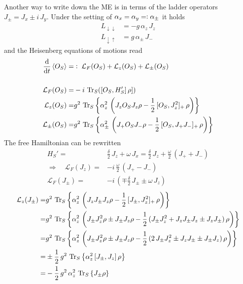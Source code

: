 \documentclass{article}
\begin{document}
Another way to write down the ME is in terms of the ladder operators $J_\pm=J_x\pm i\,J_y$. Under the setting of $\alpha_x=\alpha_y=\vcentcolon\alpha_\pm$ it holds
\begin{align*}
    L_{\downarrow\downarrow}&=-g\,\alpha_z\,J_z\\
    L_{\downarrow\uparrow}&={g}\,\alpha_\pm\,J_-
\end{align*}
and the Heisenberg equations of motions read
\begin{align*}
    \frac{\text{d}}{\text{d}t} \braket{O_S}=&\vcentcolon\;\mathcal{L}_F(O_S)+\mathcal{L}_z(O_S)+\mathcal{L}_{\pm}(O_S)\\\\
    \mathcal{L}_F(O_S)=&-i\,\operatorname{Tr}_S([O_S,H_S']\,\rho])\\
    \mathcal{L}_z(O_S)=&g^2\,\operatorname{Tr}_S\left\{\alpha_z^2\,\left(J_z O_S J_z \rho-\frac{1}{2}\,[O_S,J_z^2]_+\,\rho\right)\right\}\\
    \mathcal{L}_{\pm}(O_S)=&g^2\,\operatorname{Tr}_S\left\{\alpha_\pm^2\,\left(J_+ O_S J_- \rho-\frac{1}{2}\,[O_S,J_+ J_-]_+\,\rho\right)\right\}
\end{align*}
The free Hamiltonian can be rewritten
\begin{align*}
    H_S'=&\frac{\delta}{2}\,J_z+\omega\,J_x = \frac{\delta}{2}\,J_z+\frac{\omega}{2}\,(J_+ + J_-)\\
    \Rightarrow\quad \mathcal{L}_F(J_z)=&-i\,\frac{\omega}{2}\,(J_+ - J_-)\\
    \mathcal{L}_F(J_\pm)=&-i\,\left(\mp\frac{\delta}{2}\, J_\pm \pm \omega\, J_z\right)
\end{align*}
\begin{align*}
    \mathcal{L}_z(J_\pm)=&g^2\,\operatorname{Tr}_S\left\{\alpha_z^2\,\left(J_z J_\pm J_z \rho-\frac{1}{2}\,[J_\pm,J_z^2]_+\,\rho\right)\right\}\\
    =&g^2\,\operatorname{Tr}_S\left\{\alpha_z^2\,\left(J_\pm J_z^2\rho \pm J_\pm J_z \rho-\frac{1}{2}\,(J_\pm J_z^2 + J_z J_\pm J_z \pm J_z J_\pm)\,\rho\right)\right\}\\
    =&g^2\,\operatorname{Tr}_S\left\{\alpha_z^2\,\left(J_\pm J_z^2\rho \pm J_\pm J_z \rho-\frac{1}{2}\,(2\,J_\pm J_z^2  \pm J_z J_\pm \pm J_\pm J_z)\,\rho\right)\right\}\\
    =&\pm\frac{1}{2}\, g^2\,\operatorname{Tr}_S\left\{\alpha_z^2\,[J_\pm,J_z]\,\rho\right\}\\
    =&-\frac{1}{2}\,g^2\,\alpha_z^2\,\operatorname{Tr}_S\left\{J_\pm\rho\right\}
\end{align*}
\end{document}

